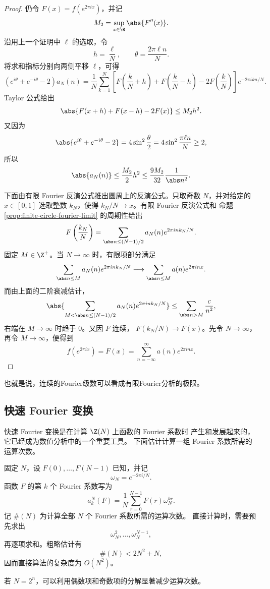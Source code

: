 \begin{proof}
	仍令 $F(x)=f(e^{2\pi ix})$，并记
	\[
	M_2=\sup_{x\in\R}\abs{F''(x)}.
	\]
	沿用上一个证明中 $\ell$ 的选取，令
	\[
	h=\frac{\ell}{N},
	\qquad
	\theta=\frac{2\pi\ell n}{N}.
	\]
	将求和指标分别向两侧平移 $\ell$，可得
	\[
	\left(e^{i\theta}+e^{-i\theta}-2\right)a_N(n)
	=\frac1N\sum_{k=1}^N
	\left[F\left(\frac{k}{N}+h\right)
	+F\left(\frac{k}{N}-h\right)
	-2F\left(\frac{k}{N}\right)\right]
	e^{-2\pi ikn/N}.
	\]
	Taylor 公式给出
	\[
	\abs{F(x+h)+F(x-h)-2F(x)}\leq M_2h^2.
	\]
	又因为
	\[
	\abs{e^{i\theta}+e^{-i\theta}-2}
	=4\sin^2\frac{\theta}{2}
	=4\sin^2\frac{\pi\ell n}{N}
	\geq2,
	\]
	所以
	\[
	\abs{a_N(n)}
	\leq\frac{M_2}{2}h^2
	\leq\frac{9M_2}{32}\frac1{\abs n^2}.
	\]

	下面由有限 Fourier 反演公式推出圆周上的反演公式。只取奇数
	$N$，并对给定的 $x\in[0,1]$ 选取整数 $k_N$，使得
	$k_N/N\to x$。有限 Fourier 反演公式和
	命题 \ref{prop:finite-circle-fourier-limit} 的周期性给出
	\[
	F\left(\frac{k_N}{N}\right)
	=\sum_{\abs n\leq(N-1)/2}
	a_N(n)e^{2\pi ink_N/N}.
	\]
	固定 $M\in\Z^+$。当 $N\to\infty$ 时，有限项部分满足
	\[
	\sum_{\abs n\leq M}a_N(n)e^{2\pi ink_N/N}
	\longrightarrow
	\sum_{\abs n\leq M}a(n)e^{2\pi inx}.
	\]
	而由上面的二阶衰减估计，
	\[
	\abs{\sum_{M<\abs n\leq(N-1)/2}
	a_N(n)e^{2\pi ink_N/N}}
	\leq\sum_{\abs n>M}\frac{c}{n^2},
	\]
	右端在 $M\to\infty$ 时趋于 $0$。又因 $F$ 连续，
	$F(k_N/N)\to F(x)$。先令 $N\to\infty$，再令
	$M\to\infty$，便得到
	\[
	f\left(e^{2\pi ix}\right)=F(x)
	=\sum_{n=-\infty}^{\infty}a(n)e^{2\pi inx}.
	\]
\end{proof}
也就是说，连续的Fourier级数可以看成有限Fourier分析的极限。
\subsection*{快速 Fourier 变换}

快速 Fourier 变换是在计算 $\Z(N)$ 上函数的 Fourier 系数时
产生和发展起来的，它已经成为数值分析中的一个重要工具。
下面估计计算一组 Fourier 系数所需的运算次数。

固定 $N$，设 $F(0),\ldots,F(N-1)$ 已知，并记
\[
\omega_N=e^{-2\pi i/N}.
\]
函数 $F$ 的第 $k$ 个 Fourier 系数写为
\[
a_k^N(F)
=\frac1N\sum_{r=0}^{N-1}F(r)\omega_N^{kr}.
\]
记 $\#(N)$ 为计算全部 $N$ 个 Fourier 系数所需的运算次数。
直接计算时，需要预先求出
\[
\omega_N^2,\ldots,\omega_N^{N-1},
\]
再逐项求和。粗略估计有
\[
\#(N)<2N^2+N,
\]
因而直接算法的复杂度为 $O(N^2)$。

若 $N=2^n$，可以利用偶数项和奇数项的分解显著减少运算次数。

